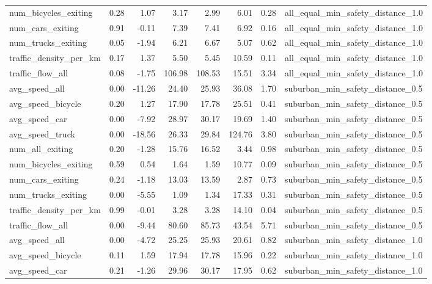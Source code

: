 \begin{table}[ht]
\begin{tabular}{lrrrrrrl}
  num\_bicycles\_exiting & 0.28 & 1.07 & 3.17 & 2.99 & 6.01 & 0.28 & all\_equal\_min\_safety\_distance\_1.0 \\ 
  num\_cars\_exiting & 0.91 & -0.11 & 7.39 & 7.41 & 6.92 & 0.16 & all\_equal\_min\_safety\_distance\_1.0 \\ 
  num\_trucks\_exiting & 0.05 & -1.94 & 6.21 & 6.67 & 5.07 & 0.62 & all\_equal\_min\_safety\_distance\_1.0 \\ 
  traffic\_density\_per\_km & 0.17 & 1.37 & 5.50 & 5.45 & 10.59 & 0.11 & all\_equal\_min\_safety\_distance\_1.0 \\ 
  traffic\_flow\_all & 0.08 & -1.75 & 106.98 & 108.53 & 15.51 & 3.34 & all\_equal\_min\_safety\_distance\_1.0 \\ 
  avg\_speed\_all & 0.00 & -11.26 & 24.40 & 25.93 & 36.08 & 1.70 & suburban\_min\_safety\_distance\_0.5 \\ 
  avg\_speed\_bicycle & 0.20 & 1.27 & 17.90 & 17.78 & 25.51 & 0.41 & suburban\_min\_safety\_distance\_0.5 \\ 
  avg\_speed\_car & 0.00 & -7.92 & 28.97 & 30.17 & 19.69 & 1.40 & suburban\_min\_safety\_distance\_0.5 \\ 
  avg\_speed\_truck & 0.00 & -18.56 & 26.33 & 29.84 & 124.76 & 3.80 & suburban\_min\_safety\_distance\_0.5 \\ 
  num\_all\_exiting & 0.20 & -1.28 & 15.76 & 16.52 & 3.44 & 0.98 & suburban\_min\_safety\_distance\_0.5 \\ 
  num\_bicycles\_exiting & 0.59 & 0.54 & 1.64 & 1.59 & 10.77 & 0.09 & suburban\_min\_safety\_distance\_0.5 \\ 
  num\_cars\_exiting & 0.24 & -1.18 & 13.03 & 13.59 & 2.87 & 0.73 & suburban\_min\_safety\_distance\_0.5 \\ 
  num\_trucks\_exiting & 0.00 & -5.55 & 1.09 & 1.34 & 17.33 & 0.31 & suburban\_min\_safety\_distance\_0.5 \\ 
  traffic\_density\_per\_km & 0.99 & -0.01 & 3.28 & 3.28 & 14.10 & 0.04 & suburban\_min\_safety\_distance\_0.5 \\ 
  traffic\_flow\_all & 0.00 & -9.44 & 80.60 & 85.73 & 43.54 & 5.71 & suburban\_min\_safety\_distance\_0.5 \\ 
  avg\_speed\_all & 0.00 & -4.72 & 25.25 & 25.93 & 20.61 & 0.82 & suburban\_min\_safety\_distance\_1.0 \\ 
  avg\_speed\_bicycle & 0.11 & 1.59 & 17.94 & 17.78 & 15.96 & 0.22 & suburban\_min\_safety\_distance\_1.0 \\ 
  avg\_speed\_car & 0.21 & -1.26 & 29.96 & 30.17 & 17.95 & 0.62 & suburban\_min\_safety\_distance\_1.0 \\ 

\end{tabular}
\end{table}
